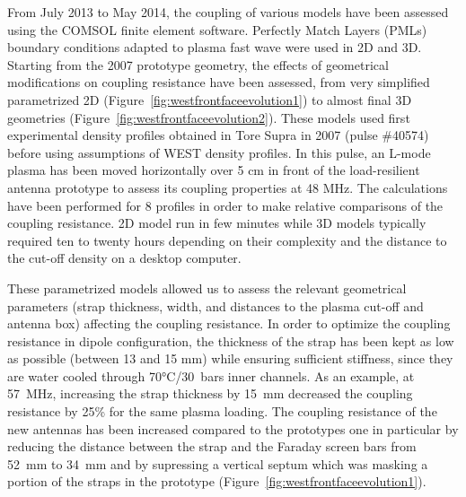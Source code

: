 From July 2013 to May 2014, the coupling of various models have been assessed using the COMSOL finite element software. Perfectly Match Layers (PMLs) boundary conditions adapted to plasma fast wave were used in 2D and 3D. Starting from the 2007 prototype geometry, the effects of geometrical modifications on coupling resistance have been assessed, from very simplified parametrized 2D (Figure~\ref{fig:westfrontfaceevolution1}) to almost final 3D geometries (Figure~\ref{fig:westfrontfaceevolution2}). These models used first experimental density profiles obtained in Tore Supra in 2007 (pulse \#40574) before using assumptions of WEST density profiles. In this pulse, an L-mode plasma has been moved horizontally over 5 cm in front of the load-resilient antenna prototype to assess its coupling properties at 48 MHz. The calculations have been performed for 8 profiles in order to make relative comparisons of the coupling resistance. 2D model run in few minutes while 3D models typically required ten to twenty hours depending on their complexity and the distance to the cut-off density on a desktop computer. 

These parametrized models allowed us to assess the relevant geometrical parameters (strap thickness, width, and distances to the plasma cut-off and antenna box) affecting the coupling resistance. In order to optimize the coupling resistance in dipole configuration, the thickness of the strap has been kept as low as possible (between 13 and 15 mm) while ensuring sufficient stiffness, since they are water cooled through 70$\si{\degreeCelsius}$/30~bars inner channels. As an example, at 57~MHz, increasing the strap thickness by 15~mm decreased the coupling resistance by 25\% for the same plasma loading. The coupling resistance of the new antennas has been increased compared to the prototypes one in particular by reducing the distance between the strap and the Faraday screen bars from 52~mm to 34~mm and by supressing a vertical septum which was masking a portion of the straps in the prototype (Figure~\ref{fig:westfrontfaceevolution1}). 

